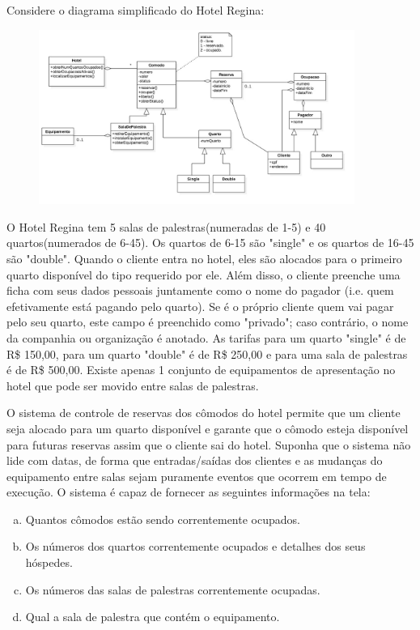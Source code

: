 \documentclass[12pt]{exam}
\begin{document}
    Considere o diagrama simplificado do Hotel Regina:
    
    \begin{figure}[ht!]
       \includegraphics[width=0.92\textwidth]{imagens/exercicios-hotel-regina-2-diagrama-de-classes.jpg}

    \end{figure}
    
       O Hotel Regina tem 5 salas de palestras(numeradas de 1-5) e 40 quartos(numerados de 6-45). Os quartos de 6-15 são "single" e os quartos de 16-45 
    são "double". Quando o cliente entra no hotel, eles são alocados para o primeiro quarto disponível do tipo requerido por ele. Além disso, o cliente 
    preenche uma ficha com seus dados pessoais juntamente como o nome do pagador (i.e. quem efetivamente está pagando pelo quarto). Se é o próprio cliente
    quem vai pagar pelo seu quarto, este campo é preenchido como "privado"; caso contrário, o nome da companhia ou organização é anotado. As tarifas para um
    quarto "single" é de R\$ 150,00, para um quarto "double" é de R\$ 250,00 e para uma sala de palestras é de R\$ 500,00. Existe apenas 1 conjunto de equipamentos
    de apresentação no hotel que pode ser movido entre salas de palestras.
    
    O sistema de controle de reservas dos cômodos do hotel permite que um cliente seja alocado para um quarto disponível e garante que o cômodo esteja disponível
    para futuras reservas assim que o cliente sai do hotel. Suponha que o sistema não lide com datas, de forma que entradas/saídas dos clientes e as mudanças do 
    equipamento entre salas sejam puramente eventos que ocorrem em tempo de execução. O sistema é capaz de fornecer as seguintes informações na tela:
    
    \begin{enumerate}[(a)]
     \item Quantos cômodos estão sendo correntemente ocupados.
     \item Os números dos quartos correntemente ocupados e detalhes dos seus hóspedes.
     \item Os números das salas de palestras correntemente ocupadas.
     \item Qual a sala de palestra que contém o equipamento.
    \end{enumerate}
\end{document}
